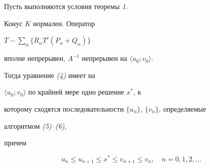




\begin{thm} Пусть выполняются условия теоремы {\em 1.}


Конус $K$ нормален. Оператор\linebreak


$T-\sum\limits_\alpha\{R_\alpha T'(P_\alpha+Q_\alpha)\}$


вполне непрерывен, $A^{-1}$ непрерывен на $\langle u_0;v_0\rangle$.





Тогда уравнение {\em (4)} имеет на


$\langle u_0;v_0\rangle$ по крайней мере одно решение $x^*$, к


которому сходятся последовательности $\{u_n\}$, $\{v_n\}$, определяемые


алгоритмом {\em (5)--(6)},


причем


\begin{equation}


u_n\le u_{n+1}\le x^*\le v_{n+1}\le v_n,\quad n=0,1,2,\dotsc


\end{equation}


\end{thm}





